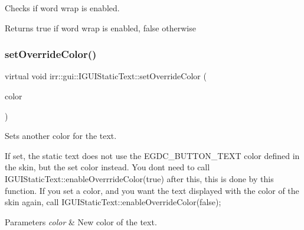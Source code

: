Checks if word wrap is enabled. 

\begin{DoxyReturn}{Returns}
true if word wrap is enabled, false otherwise 
\end{DoxyReturn}
\mbox{\label{classirr_1_1gui_1_1IGUIStaticText_aadc1f0e10e4b298944e6dcfd49e54009}} 
\subsubsection{\texorpdfstring{set\+Override\+Color()}{setOverrideColor()}\hspace{0.1cm}{\footnotesize\ttfamily [1/2]}}
{\footnotesize\ttfamily virtual void irr\+::gui\+::\+I\+G\+U\+I\+Static\+Text\+::set\+Override\+Color (\begin{DoxyParamCaption}\item[{\hyperlink{classirr_1_1video_1_1SColor}{video\+::\+S\+Color}}]{color }\end{DoxyParamCaption})\hspace{0.3cm}{\ttfamily [pure virtual]}}



Sets another color for the text. 

If set, the static text does not use the E\+G\+D\+C\+\_\+\+B\+U\+T\+T\+O\+N\+\_\+\+T\+E\+XT color defined in the skin, but the set color instead. You don\textquotesingle{}t need to call I\+G\+U\+I\+Static\+Text\+::enable\+Overrride\+Color(true) after this, this is done by this function. If you set a color, and you want the text displayed with the color of the skin again, call I\+G\+U\+I\+Static\+Text\+::enable\+Override\+Color(false); 
\begin{DoxyParams}{Parameters}
{\em color} & New color of the text. \\
\hline
\end{DoxyParams}
\mbox{\label{classirr_1_1gui_1_1IGUIStaticText_aadc1f0e10e4b298944e6dcfd49e54009}} 
